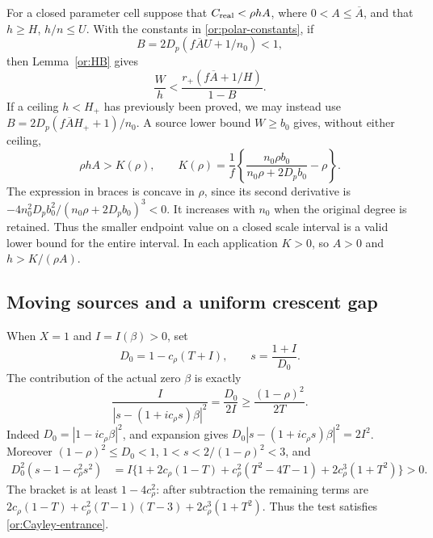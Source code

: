 For a closed parameter cell suppose that
$C_{\rm real}<\rho h A$, where $0<A\le\overline A$, and that
$h\ge H$, $h/n\le U$.  With the constants in
\eqref{or:polar-constants}, if
\begin{equation}\label{or:HB-cell-denominator}
              B=2D_p(f\overline A U+1/n_0)<1,
\end{equation}
then Lemma~\ref{or:HB} gives
\begin{equation}\label{or:HB-cell}
                  \frac Wh<\frac{r_+(f\overline A+1/H)}{1-B}.
\end{equation}
If a ceiling $h<H_+$ has previously been proved, we may instead use
$B=2D_p(f\overline A H_++1)/n_0$.  A source lower bound $W\ge b_0$
gives, without either ceiling,
\begin{equation}\label{or:direct-K}
 \rho h A>K(\rho),\qquad
 K(\rho)=\frac1f\left\{\frac{n_0\rho b_0}
                         {n_0\rho+2D_p b_0}-\rho\right\}.
\end{equation}
The expression in braces is concave in $\rho$, since its second
derivative is $-4n_0^2D_pb_0^2/(n_0\rho+2D_pb_0)^3<0$.
It increases with $n_0$ when the original degree is retained.  Thus
the smaller endpoint value on a closed scale interval is a valid
lower bound for the entire interval.  In each application $K>0$,
so $A>0$ and $h>K/(\rho A)$.

\subsection{Moving sources and a uniform crescent gap}

When $X=1$ and $I=I(\beta)>0$, set
\begin{equation}\label{or:moving-test}
 D_0=1-c_\rho(T+I),\qquad s=\frac{1+I}{D_0}.
\end{equation}
The contribution of the actual zero $\beta$ is exactly
\begin{equation}\label{or:moving-weight}
 \frac{I}{|s-(1+ic_\rho s)\beta|^2}
       =\frac{D_0}{2I}\ge\frac{(1-\rho)^2}{2T}.
\end{equation}
Indeed $D_0=|1-ic_\rho\beta|^2$, and expansion gives
$D_0|s-(1+ic_\rho s)\beta|^2=2I^2$.
Moreover $(1-\rho)^2\le D_0<1$, $1<s<2/(1-\rho)^2<3$, and
\begin{align}
 D_0^2(s-1-c_\rho^2s^2)
 &=I\{1+2c_\rho(1-T)+c_\rho^2(T^2-4T-1)
                      +2c_\rho^3(1+T^2)\}>0.\label{or:moving-domain}
\end{align}
The bracket is at least $1-4c_\rho^2$: after subtraction the
remaining terms are
$2c_\rho(1-T)+c_\rho^2(T-1)(T-3)+2c_\rho^3(1+T^2)$.
Thus the test satisfies \eqref{or:Cayley-entrance}.

